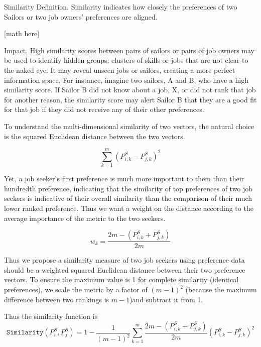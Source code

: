 Similarity
Definition.
Similarity indicates how closely the preferences of two Sailors or two job owners’ preferences are aligned.

[math here]


Impact. 
High similarity scores between pairs of sailors or pairs of job owners may be used to identify hidden groups; clusters of skills or jobs that are not clear to the naked eye. It may reveal unseen jobs or sailors, creating a more perfect information space. For instance, imagine two sailors, A and B, who have a high similarity score. If Sailor B did not know about a job, X, or did not rank that job for another reason, the similarity score may alert Sailor B that they are a good fit for that job if they did not receive any of their other preferences.

To understand the multi-dimensional similarity of two vectors, the natural choice is the squared Euclidean distance between the two vectors. 

\[\sum_{k=1}^{m} (P^S_{i,k} - P^S_{j,k})^2\]

Yet, a job seeker's first preference is much more important to them than their hundredth preference, indicating that the similarity of top preferences of two job seekers is indicative of their overall similarity than the comparison of their much lower ranked preference.  Thus we want a weight on the distance according to the average importance of the metric to the two seekers.

\[w_k = \frac{2m - (P^S_{i,k} + P^S_{j,k})}{2m}\]


Thus we propose a similarity measure of two job seekers using preference data should be a weighted squared Euclidean distance between their two preference vectors. To ensure the maximum value is 1 for complete similarity (identical preferences), we scale the metric by a factor of $(m-1)^2$ (because the maximum difference between two rankings is $m-1$)and subtract it from 1.

Thus the similarity function is
\[\texttt{Similarity}(P^S_i, P^S_j) = 1 - \frac{1}{(m-1)^2}\sum_{k=1}^{m} \frac{2m - (P^S_{i,k} + P^S_{j,k})}{2m}(P^S_{i,k} - P^S_{j,k})^2\]